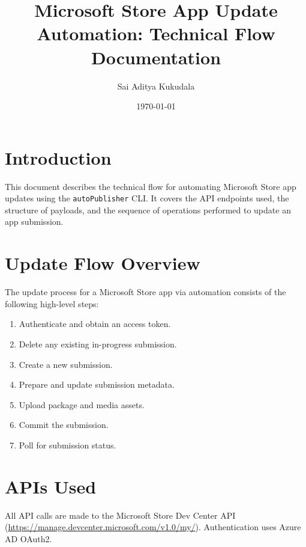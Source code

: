 \documentclass{article}
\title{Microsoft Store App Update Automation: Technical Flow Documentation}
\author{Sai Aditya Kukudala}
\date{\today}
\begin{document}
\maketitle

\section{Introduction}
This document describes the technical flow for automating Microsoft Store app updates using the \texttt{autoPublisher} CLI. It covers the API endpoints used, the structure of payloads, and the sequence of operations performed to update an app submission.

\section{Update Flow Overview}
The update process for a Microsoft Store app via automation consists of the following high-level steps:
\begin{enumerate}
    \item Authenticate and obtain an access token.
    \item Delete any existing in-progress submission.
    \item Create a new submission.
    \item Prepare and update submission metadata.
    \item Upload package and media assets.
    \item Commit the submission.
    \item Poll for submission status.
\end{enumerate}

\section{APIs Used}
All API calls are made to the Microsoft Store Dev Center API (\url{https://manage.devcenter.microsoft.com/v1.0/my/}). Authentication uses Azure AD OAuth2.
\end{document}
